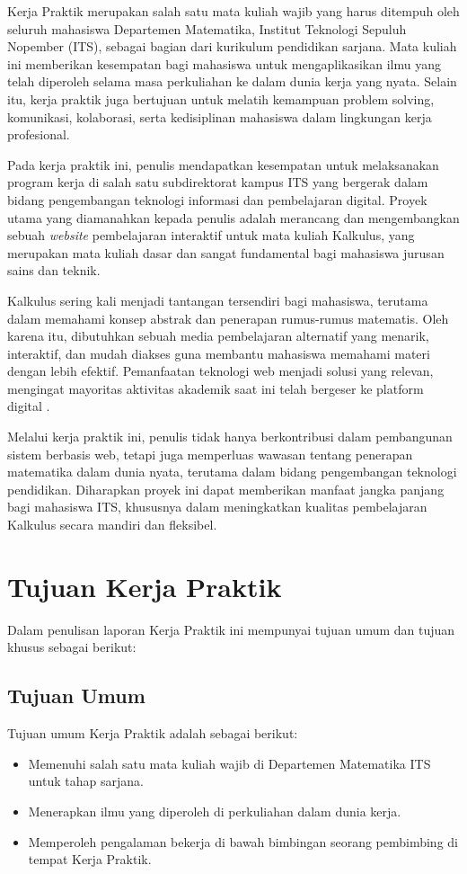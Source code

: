 \documentclass{file/KP-ITS}
\theoremstyle{definition}
\theoremstyle{definition}
\theoremstyle{plain}
\begin{document}
Kerja Praktik merupakan salah satu mata kuliah wajib yang harus ditempuh oleh seluruh mahasiswa Departemen Matematika, Institut Teknologi Sepuluh Nopember (ITS), sebagai bagian dari kurikulum pendidikan sarjana. Mata kuliah ini memberikan kesempatan bagi mahasiswa untuk mengaplikasikan ilmu yang telah diperoleh selama masa perkuliahan ke dalam dunia kerja yang nyata. Selain itu, kerja praktik juga bertujuan untuk melatih kemampuan problem solving, komunikasi, kolaborasi, serta kedisiplinan mahasiswa dalam lingkungan kerja profesional.

Pada kerja praktik ini, penulis mendapatkan kesempatan untuk melaksanakan program kerja di salah satu subdirektorat kampus ITS yang bergerak dalam bidang pengembangan teknologi informasi dan pembelajaran digital. Proyek utama yang diamanahkan kepada penulis adalah merancang dan mengembangkan sebuah \textit{website} pembelajaran interaktif untuk mata kuliah Kalkulus, yang merupakan mata kuliah dasar dan sangat fundamental bagi mahasiswa jurusan sains dan teknik.

Kalkulus sering kali menjadi tantangan tersendiri bagi mahasiswa, terutama dalam memahami konsep abstrak dan penerapan rumus-rumus matematis. Oleh karena itu, dibutuhkan sebuah media pembelajaran alternatif yang menarik, interaktif, dan mudah diakses guna membantu mahasiswa memahami materi dengan lebih efektif. Pemanfaatan teknologi web menjadi solusi yang relevan, mengingat mayoritas aktivitas akademik saat ini telah bergeser ke platform digital \cite{mustafidah2010,rahmawati2018}.

Melalui kerja praktik ini, penulis tidak hanya berkontribusi dalam pembangunan sistem berbasis web, tetapi juga memperluas wawasan tentang penerapan matematika dalam dunia nyata, terutama dalam bidang pengembangan teknologi pendidikan. Diharapkan proyek ini dapat memberikan manfaat jangka panjang bagi mahasiswa ITS, khususnya dalam meningkatkan kualitas pembelajaran Kalkulus secara mandiri dan fleksibel.

\section{Tujuan Kerja Praktik}
Dalam penulisan laporan Kerja Praktik ini mempunyai tujuan umum dan tujuan khusus sebagai berikut:
\subsection{Tujuan Umum}
Tujuan umum Kerja Praktik adalah sebagai berikut:
\begin{itemize}
    \item Memenuhi salah satu mata kuliah wajib di Departemen Matematika ITS untuk tahap sarjana.
    \item Menerapkan ilmu yang diperoleh di perkuliahan dalam dunia kerja.
    \item Memperoleh pengalaman bekerja di bawah bimbingan seorang pembimbing di tempat Kerja Praktik.
\end{itemize}
\end{document}
